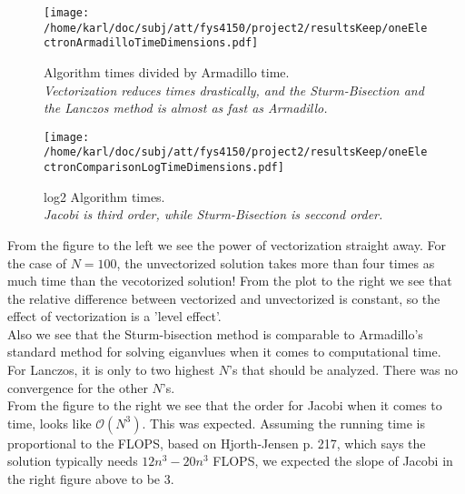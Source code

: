 \documentclass{article}
\begin{document}
\begin{minipage}{.49\textwidth} %
	\begin{figure}[H]
		\centering
		\texttt{[image: /home/karl/doc/subj/att/fys4150/project2/resultsKeep/oneElectronArmadilloTimeDimensions.pdf]}
		\caption{Algorithm times divided by Armadillo time.\\ \textit{Vectorization reduces times drastically, and the Sturm-Bisection and the Lanczos  method is almost as fast as Armadillo.}}
		\label{1}
	\end{figure}
\end{minipage}\hfill
\vspace{2ex}
\begin{minipage}{.49\textwidth}
	\begin{figure}[H]
		\centering
		\texttt{[image: /home/karl/doc/subj/att/fys4150/project2/resultsKeep/oneElectronComparisonLogTimeDimensions.pdf]}
		\caption{log2 Algorithm times.\\ \textit{Jacobi is third order, while Sturm-Bisection is seccond order.}}
		\label{1}
	\end{figure}
\end{minipage}\hfill
\vspace{2ex}

From the figure to the left we see the power of vectorization straight away. For the case of $N = 100$, the unvectorized solution takes more than four times as much time than the vecotorized solution! From the plot to the right we see that the relative difference between vectorized and unvectorized is constant, so the effect of vectorization is a 'level effect'. \\

Also we see that the Sturm-bisection method is comparable to Armadillo's standard method for solving eiganvlues when it comes to computational time. \\

For Lanczos, it is only to two highest $N$'s that should be analyzed. There was no convergence for the other $N$'s.\\

From the figure to the right we see that the order for Jacobi when it comes to time, looks like $\mathcal{O}(N^3).$ This was expected. Assuming the running time is proportional to the FLOPS, based on Hjorth-Jensen \cite{MHJ} p. 217, which says the solution typically needs $12n^3-20n^3$ FLOPS, we expected the slope of Jacobi in the right figure above to be 3. \\
\end{document}
